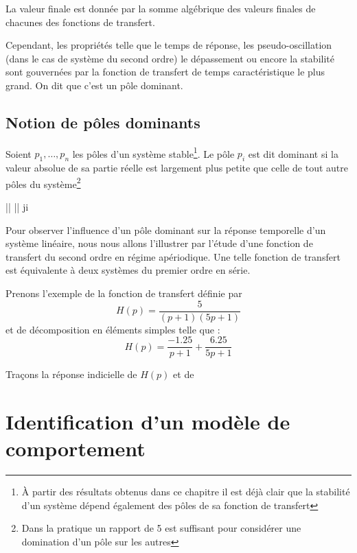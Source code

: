 La valeur finale est donnée par la somme algébrique des valeurs finales de chacunes
des fonctions de transfert.

Cependant, les propriétés telle que le temps de réponse, 
les pseudo-oscillation (dans le cas de système du second ordre) 
le dépassement ou encore la stabilité sont gouvernées 
par la fonction de transfert de 
temps caractéristique le plus grand. On dit que c'est un pôle dominant.

\subsection{Notion de pôles dominants}

Soient $p_1,\ldots,p_n$ les pôles d'un système stable\footnote{À partir 
des résultats obtenus dans ce chapitre il est déjà clair que la stabilité
d'un système dépend également des pôles de sa fonction de transfert}.
Le pôle $p_i$ est dit dominant si la valeur absolue
de sa partie réelle est largement plus petite que celle de tout autre pôles 
du système\footnote{Dans la pratique un rapport de 5 est 
suffisant pour considérer une domination d'un pôle sur les autres}
\begin{bequation}
	\big|\big| \ll \big|\big|\;\; \forall j\neq i
\end{bequation}

Pour observer l'influence d'un pôle dominant sur 
la réponse temporelle d'un système linéaire, nous
nous allons l'illustrer par l'étude d'une fonction 
de transfert du second ordre en régime apériodique.
Une telle fonction de transfert est équivalente à deux
systèmes du premier ordre en série.

Prenons l'exemple de la fonction de transfert définie par  
$$
H(p)=\dfrac{5}{(p+1)(5p+1)}
$$
et de décomposition en éléments simples telle que :
$$
H(p)=\dfrac{-1.25}{p+1}+\dfrac{6.25}{5p+1}
$$

Traçons la réponse indicielle de $H(p)$ et de


\begin{center}
\end{center}


\newpage
\section{Identification d'un modèle de comportement}

